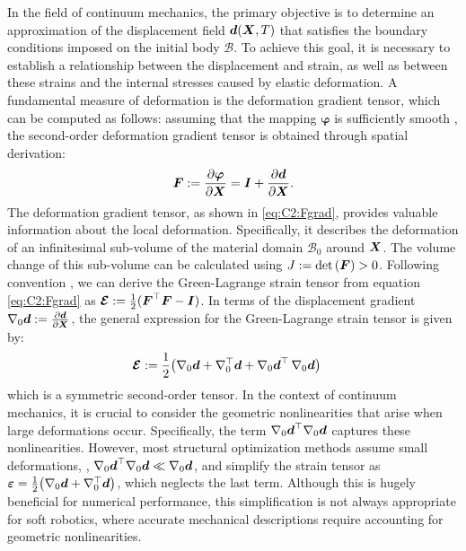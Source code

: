 In the field of continuum mechanics, the primary objective is to determine an approximation of the displacement field ${\boldsymbol{d}}({\boldsymbol{X}},T)$ that satisfies the boundary conditions imposed on the initial body $\mathcal{B}$. To achieve this goal, it is necessary to establish a relationship between the displacement and strain, as well as between these strains and the internal stresses caused by elastic deformation. A fundamental measure of deformation is the deformation gradient tensor, which can be computed as follows: assuming that the mapping $\boldsymbol{\varphi}$ is sufficiently smooth \cite{Kim2018,Holzapfel2002}, the second-order deformation gradient tensor is obtained through spatial derivation:
%
\begin{align}
\boldsymbol{F} := \frac{\partial \boldsymbol{\varphi} }{\partial \boldsymbol{X}}   = \boldsymbol{I} + \frac{\partial {\boldsymbol{d}} }{\partial \boldsymbol{X}}.
\label{eq:C2:Fgrad}
\end{align}
%
The deformation gradient tensor, as shown in \eqref{eq:C2:Fgrad}, provides valuable information about the local deformation. Specifically, it describes the deformation of an infinitesimal sub-volume of the material domain $\mathcal{B}_0$ around ${\boldsymbol{X}}$. The volume change of this sub-volume can be calculated using $J := \textnormal{det}\left( {{\boldsymbol{F}}} \right) > 0$. Following convention \cite{Kim2018,Holzapfel2002}, we can derive the Green-Lagrange strain tensor from equation \eqref{eq:C2:Fgrad} as ${\boldsymbol{\mathcal{E}}} : = \frac{1}{2}({\boldsymbol{F}}^\top {\boldsymbol{F}} - \boldsymbol{I})$. In terms of the displacement gradient $\nabla_{0} {\boldsymbol{d}} := \tfrac{\partial {\boldsymbol{d}}}{\partial {\boldsymbol{X}}}$, the general expression for the Green-Lagrange strain tensor is given by:
%
\begin{align}
\boldsymbol{\mathcal{E}} & := \frac{1}{2}\big( \nabla_0 {\boldsymbol{d}}  +\nabla_0^\top {\boldsymbol{d}}  + \nabla_0 {\boldsymbol{d}}^\top \, \nabla_0 {\boldsymbol{d}} \big)
\label{eq:E_tens}
\end{align}
%
which is a symmetric second-order tensor. In the context of continuum mechanics, it is crucial to consider the geometric nonlinearities that arise when large deformations occur. Specifically, the term $\nabla_0 {\boldsymbol{d}}^\top \nabla_0 {\boldsymbol{d}}$ captures these nonlinearities. However, most structural optimization methods assume small deformations, \ie, $\nabla_0 {\boldsymbol{d}}^\top \nabla_0 {\boldsymbol{d}} \ll \nabla_0 {\boldsymbol{d}}$, and simplify the strain tensor as $\boldsymbol{\varepsilon} = \tfrac{1}{2}\big( \nabla_0 {\boldsymbol{d}} + \nabla_0^\top {\boldsymbol{d}} \big)$, which neglects the last term. Although this is hugely beneficial for numerical performance, this simplification is not always appropriate for soft robotics, where accurate mechanical descriptions require accounting for geometric nonlinearities.

